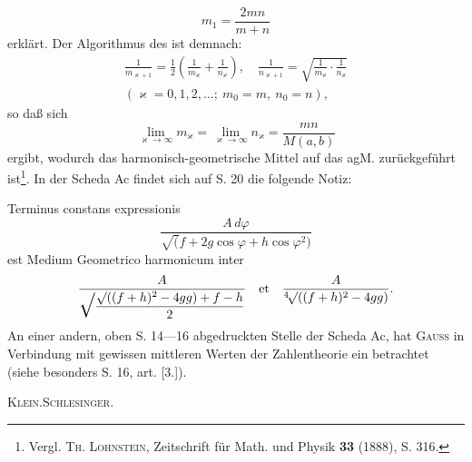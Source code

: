 \[
m_1=\frac{2mn}{m+n}
\]
\noindent erklärt. Der Algorithmus des  ist demnach:
\[
\begin{gathered}
\frac1{m_{\varkappa+1}}=\frac12\left(\frac1{m_\varkappa}+\frac1{n_\varkappa}\right),\quad\frac1{n_{\varkappa+1}}=\sqrt{\frac1{m_\varkappa}\cdot\frac1{n_\varkappa}}\\
(\varkappa=0,1,2,\ldots;\ m_0=m,\ n_0=n),
\end{gathered}
\]
\noindent so daß sich
\[
\lim_{\varkappa\to\infty}m_\varkappa=\lim_{\varkappa\to\infty}n_\varkappa=\frac{mn}{M(a,b)}
\]
\noindent ergibt, wodurch das harmonisch-geometrische Mittel auf das agM. zurückgeführt ist\footnote{Vergl. \textsc{Th. Lohnstein}, Zeitschrift für Math. und Physik \textbf{33} (1888), S. 316.}. In der Scheda Ac findet sich auf S. 20 die folgende Notiz:
\par\endgroup

\clearpage{}
\indent Terminus constans expressionis
\[
\frac{A\,d\varphi}{\surd(f+2g\cos\varphi+h\cos\varphi^2)}
\]
\noindent est Medium Geometrico harmonicum inter
\[
\frac{A}{\mathord{\raisebox{-.25ex}{\scalebox{1.45}[2.0]{$\surd$}}}\dfrac{\surd((f+h)^2-4gg)+f-h}{2}}
\quad\text{et}\quad\frac{A}{{}^{4}\!\surd((f+h)^2-4gg)}.
\]
\medskip\begingroup\small
\noindent An einer andern, oben S. 14—16 abgedruckten Stelle der Scheda Ac, hat \textsc{Gauss} in Verbindung mit gewissen mittleren Werten der Zahlentheorie ein  betrachtet (siehe besonders S. 16, art. [3.]).
\par\noindent\hfill\textsc{Klein.\quad Schlesinger.}
\par\endgroup
